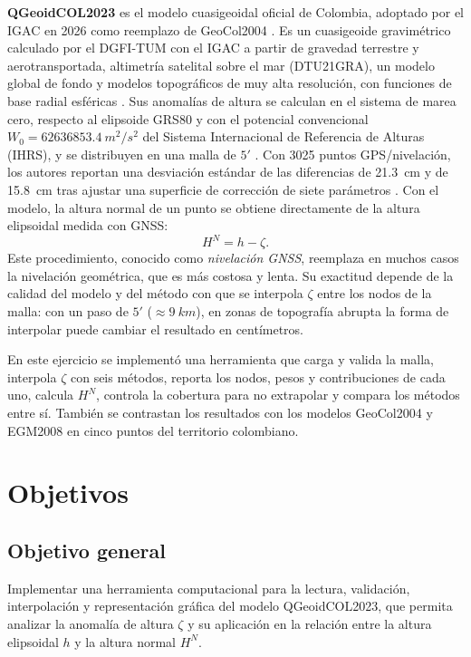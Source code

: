 \documentclass[11pt,letterpaper]{article}
\begin{document}
\textbf{QGeoidCOL2023} es el modelo cuasigeoidal oficial de Colombia, adoptado por el
IGAC en 2026 como reemplazo de GeoCol2004 \citep{igacnoticia}. Es un cuasigeoide gravimétrico
calculado por el DGFI-TUM con el IGAC a partir de gravedad terrestre y aerotransportada, altimetría
satelital sobre el mar (DTU21GRA), un modelo global de fondo y modelos topográficos de muy alta
resolución, con funciones de base radial esféricas \citep{liu2024,isg}. Sus anomalías de altura se
calculan en el sistema de marea cero, respecto al elipsoide GRS80 y con el potencial convencional
$W_0=\SI{62636853.4}{m^2/s^2}$ del Sistema Internacional de Referencia de Alturas (IHRS), y se
distribuyen en una malla de $5'$ \citep{liu2024,isg}. Con 3025 puntos GPS/nivelación, los autores
reportan una desviación estándar de las diferencias de \SI{21.3}{cm} y de \SI{15.8}{cm} tras ajustar
una superficie de corrección de siete parámetros \citep{liu2024}. Con el modelo, la altura normal de
un punto se obtiene directamente de la altura elipsoidal medida con GNSS:
\begin{equation}
H^N = h - \zeta.
\label{eq:hn}
\end{equation}
Este procedimiento, conocido como \emph{nivelación GNSS}, reemplaza en muchos casos la
nivelación geométrica, que es más costosa y lenta. Su exactitud depende de la calidad del
modelo y del método con que se interpola $\zeta$ entre los nodos de la malla: con un paso
de $5'$ ($\approx\SI{9}{km}$), en zonas de topografía abrupta la forma de interpolar puede
cambiar el resultado en centímetros.

En este ejercicio se implementó una herramienta que carga y valida la malla, interpola
$\zeta$ con seis métodos, reporta los nodos, pesos y contribuciones de cada uno, calcula
$H^N$, controla la cobertura para no extrapolar y compara los métodos entre sí. También se
contrastan los resultados con los modelos GeoCol2004 y EGM2008 en cinco puntos del
territorio colombiano.

\section{Objetivos}
\subsection{Objetivo general}
Implementar una herramienta computacional para la lectura, validación, interpolación y
representación gráfica del modelo QGeoidCOL2023, que permita analizar la anomalía de
altura $\zeta$ y su aplicación en la relación entre la altura elipsoidal $h$ y la altura
normal $H^N$.
\end{document}
